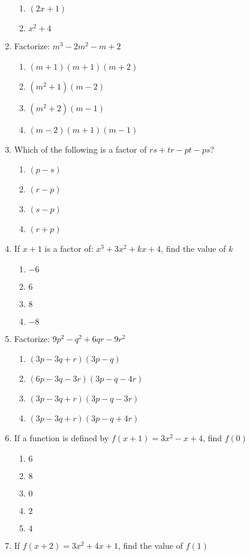 \begin{multicols}{2}
\begin{enumerate}[label={\arabic*.}]
\begin{enumerate}[label={\Alph*.}]
	\item \((2x+1)\)
	\item \({x}^{2}+4\)
	\end{enumerate}
\item Factorize: \(m^3-2m^2-m+2\)
	\begin{enumerate}[label={\Alph*.}]
	\item \((m+1)(m+1)(m+2)\)
	\item \((m^2+1)(m-2)\)
	\item \((m^2+2)(m-1)\)
	\item \((m-2)(m+1)(m-1)\)
	\end{enumerate}
\item Which of the following is a factor of \(rs+tr-pt-ps\)?
	\begin{enumerate}[label={\Alph*.}]
	\item \((p-s)\)
	\item \((r-p)\)
	\item \((s-p)\)
	\item \((r+p)\)
	\end{enumerate}
\item If \(x+1\) is a factor of: \({x}^{3}+3{x}^{2}+kx+4\), find the value of \(k\)
	\begin{enumerate}[label={\Alph*.}]
	\item \(-6\)
	\item \(6\)
	\item \(8\)
	\item \(-8\)
	\end{enumerate}
\item Factorize: \(9p^2-q^2+6qr-9r^2\)
	\begin{enumerate}[label={\Alph*.}]
	\item \((3p-3q+r)(3p-q)\)
	\item \((6p-3q-3r)(3p-q-4r)\)
	\item \((3p-3q+r)(3p-q-3r)\)
	\item \((3p-3q+r)(3p-q+4r)\)
	\end{enumerate}
\item If a function is defined by \(f(x+1) = 3x^2-x+4\), find \(f(0)\)
	\begin{enumerate}[label={\Alph*.}]
	\item \(6\)
	\item \(8\)
	\item \(0\)
	\item \(2\)
	\item \(4\)
	\end{enumerate}
\item If \(f(x+2) = 3x^2 + 4x + 1\), find the value of \(f(1)\)

\end{enumerate}
\end{multicols}

